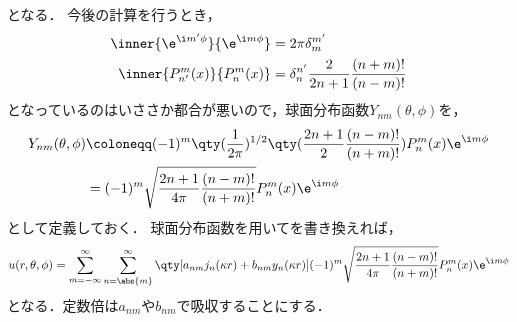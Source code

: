 \documentclass{report}
\begin{document}
      となる．
      今後の計算を行うとき，
      \begin{align}
        \inner{\e^{\i m'\phi}}{\e^{\i m\phi}} &= 2\pi\delta_m^{m'} \\ 
        \inner{P_{n'}^m(x)}{P_n^m(x)} &= \delta_{n}^{n'}\frac{2}{2n + 1}\frac{(n + m)!}{(n - m)!}
      \end{align}
      となっているのはいささか都合が悪いので，球面分布函数$Y_{nm}(\theta, \phi)$を，
      \begin{align}
        Y_{nm}(\theta, \phi) &\coloneqq (-1)^m\qty(\frac{1}{2\pi})^{1/2}\qty(\frac{2n + 1}{2}\frac{(n - m)!}{(n + m)!})P_n^m(x)\e^{\i m\phi} \\ 
        &= (-1)^m\sqrt{\frac{2n + 1}{4\pi}\frac{(n - m)!}{(n + m)!}}P_n^m(x)\e^{\i m\phi}
      \end{align}
      として定義しておく．
      球面分布函数を用いてを書き換えれば，
      \begin{align}
        u(r, \theta, \phi) = \sum_{m = -\infty}^{\infty}\sum_{n = \abs{m}}^{\infty}\qty[a_{nm}j_n(\kappa r) + b_{nm}y_n(\kappa r)](-1)^m\sqrt{\frac{2n + 1}{4\pi}\frac{(n - m)!}{(n + m)!}}P_n^m(x)\e^{\i m\phi} \label{u-expand-form2}
      \end{align}
      となる．定数倍は$a_{nm}$や$b_{nm}$で吸収することにする．
  
\end{document}
